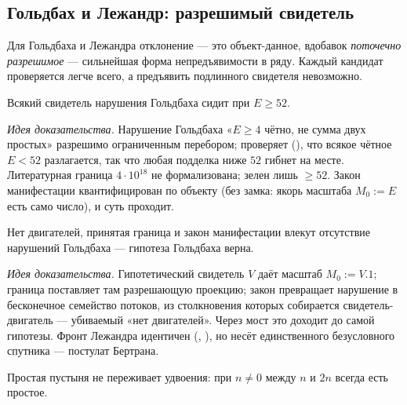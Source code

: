 \subsection{Гольдбах и Лежандр: разрешимый свидетель}

Для Гольдбаха и Лежандра отклонение --- это объект-данное, вдобавок \emph{поточечно разрешимое} ---
сильнейшая форма непредъявимости в ряду. Каждый кандидат проверяется легче всего, а предъявить
подлинного свидетеля невозможно.

\begin{theorem}\label{thm:goldbachViolation_ge_52}
\green{}\; Всякий свидетель нарушения Гольдбаха сидит при $E\ge 52$.
\end{theorem}

\emph{Идея доказательства.} Нарушение Гольдбаха «$E\ge4$ чётно, не сумма двух простых» разрешимо
ограниченным перебором;  проверяет  (\green{}), что всякое
чётное $E<52$ разлагается, так что любая подделка ниже $52$ гибнет на месте. Литературная граница
$4\cdot10^{18}$ не формализована; зелен лишь $\ge52$. Закон манифестации квантифицирован по объекту
(без замка: якорь масштаба $M_0:=E$ есть само число), и суть проходит.

\begin{theorem}\label{thm:noGoldbachViolation_of_manifestation_and_boundary}
\green{}\; Нет двигателей, принятая граница и закон манифестации влекут отсутствие нарушений
Гольдбаха --- гипотеза Гольдбаха верна.
\end{theorem}

\emph{Идея доказательства.} Гипотетический свидетель $V$ даёт масштаб $M_0:=V.1$; граница поставляет
там разрешающую проекцию; закон превращает нарушение в бесконечное семейство потоков, из столкновения
которых собирается свидетель-двигатель --- убиваемый «нет двигателей». Через мост
 это доходит до самой гипотезы. Фронт Лежандра идентичен
(, \green{}), но несёт единственного
безусловного спутника --- постулат Бертрана.

\begin{theorem}\label{thm:no_desert_doubles}
\green{}\; Простая пустыня не переживает удвоения: при $n\neq0$ между $n$ и $2n$ всегда есть простое.
\end{theorem}

